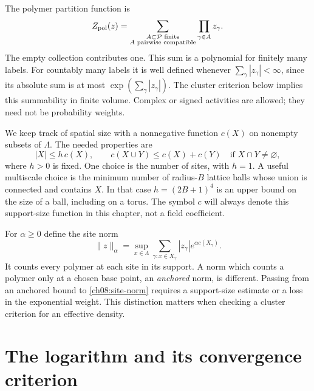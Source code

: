 The polymer partition function is
\begin{equation}\label{ch08:gas}
 Z_{\rm pol}(z)=\sum_{\substack{A\subset\mathcal P\text{ finite}\\
                         A\text{ pairwise compatible}}}
                       \prod_{\gamma\in A}z_\gamma.
\end{equation}
The empty collection contributes one. This sum is a polynomial for finitely
many labels. For countably many labels it is well defined whenever
$\sum_\gamma|z_\gamma|<\infty$, since its absolute sum is at most
$\exp(\sum_\gamma|z_\gamma|)$. The cluster criterion below implies this
summability in finite volume. Complex or signed activities are allowed;
they need not be probability weights.

We keep track of spatial size with a nonnegative function $c(X)$ on
nonempty subsets of $\Lambda$. The needed properties are
\begin{equation}\label{ch08:cover-properties}
 |X|\le h\,c(X),\qquad
 c(X\cup Y)\le c(X)+c(Y)\quad\text{if }X\cap Y\ne\varnothing,
\end{equation}
where $h>0$ is fixed. One choice is the number of sites, with $h=1$.
A useful multiscale choice is the minimum number of radius-$B$ lattice
balls whose union is connected and contains $X$. In that case
$h=(2B+1)^4$ is an upper bound on the size of a ball, including on a torus.
The symbol $c$ will always denote this support-size function in this chapter,
not a field coefficient.

For $\alpha\ge0$ define the site norm
\begin{equation}\label{ch08:site-norm}
 \|z\|_\alpha=
 \sup_{x\in\Lambda}\sum_{\gamma:x\in X_\gamma}
                  |z_\gamma|e^{\alpha c(X_\gamma)}.
\end{equation}
It counts every polymer at each site in its support. A norm which counts
a polymer only at a chosen base point, an \emph{anchored} norm, is different. Passing from an anchored
bound to \eqref{ch08:site-norm} requires a support-size estimate or a loss
in the exponential weight. This distinction matters when checking a
cluster criterion for an effective density.

\section{The logarithm and its convergence criterion}
\label{ch08:criterion}


